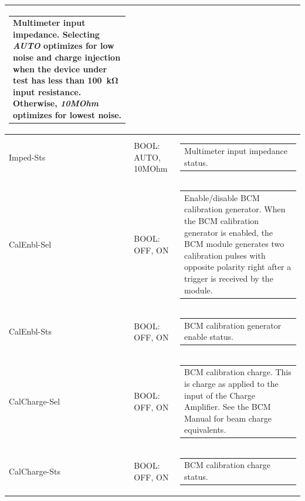 \documentclass[openany]{article}
\begin{document}
\begin{longtable}{| m{3.0cm} m{4.5cm} m{7.0cm} |}
\begin{tabular}{@{}m{6cm}@{}}
	    					Multimeter input impedance. Selecting \emph{AUTO} optimizes for low noise and charge injection when the device under test has less than \SI{100}{\kohm} input resistance. Otherwise, \emph{10MOhm} optimizes for lowest noise.
						\end{tabular} \\ \hline
		Imped-Sts & BOOL: AUTO, 10MOhm & \begin{tabular}{@{}m{6cm}@{}}
	    					Multimeter input impedance status.
						\end{tabular} \\ \hline
		CalEnbl-Sel & BOOL: OFF, ON & \begin{tabular}{@{}m{6cm}@{}}
	    					Enable/disable BCM calibration generator. When the BCM calibration generator is enabled, the BCM module generates two calibration pulses with opposite polarity right after a trigger is received by the module.
						\end{tabular} \\ \hline
		CalEnbl-Sts & BOOL: OFF, ON & \begin{tabular}{@{}m{6cm}@{}}
 						BCM calibration generator enable status.
						\end{tabular} \\ \hline
		CalCharge-Sel & BOOL: OFF, ON & \begin{tabular}{@{}m{6cm}@{}}
	    					BCM calibration charge. This is charge as applied to the input of the Charge Amplifier. See the BCM Manual for beam charge equivalents.
						\end{tabular} \\ \hline
		CalCharge-Sts & BOOL: OFF, ON & \begin{tabular}{@{}m{6cm}@{}}
 						BCM calibration charge status.
						\end{tabular} \\ \hline
	\end{longtable}
\end{document}
